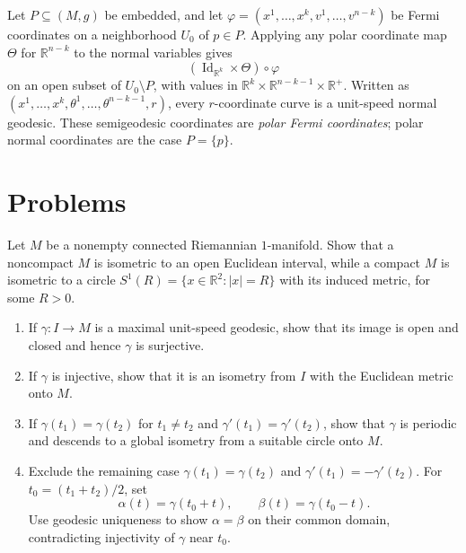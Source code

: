 \begin{example}
\label{ex:polar-fermi-coordinates}

Let $P\subseteq(M,g)$ be embedded, and let
$\varphi=(x^1,\ldots,x^k,v^1,\ldots,v^{n-k})$ be Fermi coordinates on a
neighborhood $U_0$ of $p\in P$. Applying any polar coordinate map $\Theta$
for $\mathbb R^{n-k}$ to the normal variables gives
\[
(\operatorname{Id}_{\mathbb R^k}\times\Theta)\circ\varphi
\]
on an open subset of $U_0\setminus P$, with values in
$\mathbb R^k\times\mathbb R^{n-k-1}\times\mathbb R^+$. Written as
$(x^1,\ldots,x^k,\theta^1,\ldots,\theta^{n-k-1},r)$, every $r$-coordinate
curve is a unit-speed normal geodesic. These semigeodesic coordinates are
\emph{polar Fermi coordinates}; polar normal coordinates are the case
$P=\{p\}$.
\end{example}
\section{Problems}

\begin{exercise}
\label{prob:connected-riemannian-1-manifold-structure}

Let $M$ be a nonempty connected Riemannian $1$-manifold.  Show that a
noncompact $M$ is isometric to an open Euclidean interval, while a compact
$M$ is isometric to a circle
$S^1(R)=\{x\in\mathbb R^2:|x|=R\}$ with its induced metric, for some $R>0$.
\begin{enumerate}
\item[(a)] If $\gamma:I\to M$ is a maximal unit-speed geodesic, show that its
image is open and closed and hence $\gamma$ is surjective.
\item[(b)] If $\gamma$ is injective, show that it is an isometry from $I$ with
the Euclidean metric onto $M$.
\item[(c)] If $\gamma(t_1)=\gamma(t_2)$ for $t_1\ne t_2$ and
$\gamma'(t_1)=\gamma'(t_2)$, show that $\gamma$ is periodic and descends to a
global isometry from a suitable circle onto $M$.
\item[(d)] Exclude the remaining case
$\gamma(t_1)=\gamma(t_2)$ and $\gamma'(t_1)=-\gamma'(t_2)$.  For
$t_0=(t_1+t_2)/2$, set
\[
\alpha(t)=\gamma(t_0+t),\qquad \beta(t)=\gamma(t_0-t).
\]
Use geodesic uniqueness to show $\alpha=\beta$ on their common domain,
contradicting injectivity of $\gamma$ near $t_0$.
\end{enumerate}
\end{exercise}

